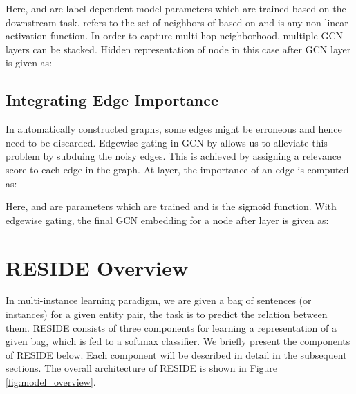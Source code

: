 \documentclass[11pt,a4paper]{article}
\newcommand{\reffig}[1]{Figure \ref{#1}}
\newcommand{\method}{RESIDE}
\begin{document}
Here,  and  are label dependent model parameters which are trained based on the downstream task.  refers to the set of neighbors of  based on  and  is any non-linear activation function. In order to capture multi-hop neighborhood, multiple GCN layers can be stacked. Hidden representation of node  in this case after  GCN layer is given as:

\subsection{Integrating Edge Importance} 
In automatically constructed graphs, some edges might be erroneous and hence need to be discarded. Edgewise gating in GCN by \cite{gcn_nmt,gcn_srl} allows us to alleviate this problem by subduing the noisy edges. This is achieved by assigning a relevance score to each edge in the graph. At  layer, the importance of an edge  is computed as:

Here,  and  are parameters which are trained and  is the sigmoid function. With edgewise gating, the final GCN embedding for a node  after  layer is given as:

 

\section{\method{} Overview}
\label{sec:overview}

In multi-instance learning paradigm, we are given a bag of sentences (or instances)  for a given entity pair, the task is to predict the relation between them.
\method{} consists of three components for learning a representation of a given bag, which is fed to a softmax classifier. We briefly present the components of \method{} below. Each component will be described in detail in the subsequent sections. The overall architecture of \method{} is shown in \reffig{fig:model_overview}.
\end{document}
